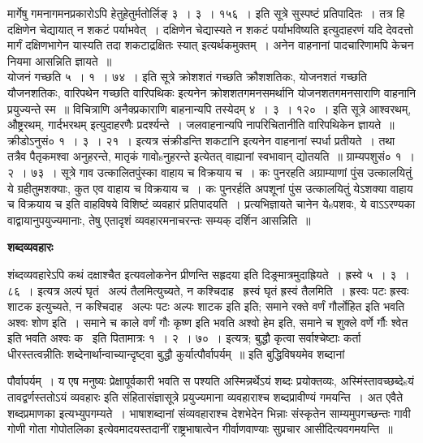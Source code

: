\documentclass[11pt, openany]{book}
\begin{document}
मार्गेषु गमनागमनप्रकारोऽपि हेतुहेतुर्मतोर्लिङ् ३~। ३~। १५६~। इति सूत्रे सुस्पष्टं प्रतिपादितः~। तत्र हि {\qt दक्षिणेन चेद्यायात् न शकटं पर्याभवेत्~।} दक्षिणेन चेद्यास्यते न शकटं पर्याभविष्यति इत्युदाहरणं {\qt यदि देवदत्तो मार्गं दक्षिणभागेन यास्यति तदा शकटाद्रक्षितः स्यात्} इत्यर्थकमुक्तम्~। अनेन वाहनानां पादचारिणामपि केचन नियमा आसन्निति ज्ञायते~॥\\

योजनं गच्छति ५~। १~। ७४~। इति सूत्रे {\qt क्रोशशतं गच्छति क्रौशशतिकः, योजनशतं गच्छति यौजनशतिकः, वारिपथेन गच्छति वारिपथिकः इत्यनेन क्रोशशतगमनसमर्थानि योजनशतगमनसाराणि वाहनानि प्रयुज्यन्ते स्म~॥} विचित्राणि अनैक्प्रकाराणि बाहनान्यपि तस्येदम् ४~। ३~। १२०~। इति सूत्रे {\qt आश्वरथम्, औष्ट्ररथम्, गार्दभरथम्} इत्युदाहरणैः प्रदर्श्यन्ते~। जलवाहनान्यपि नापरिचितानीति वारिपथिकेन ज्ञायते~॥ क्रीडोऽनुसं० १~। ३~। २१~। इत्यत्र {\qt संक्रीडन्ति शकटानि} इत्यनेन वाहनानां स्पर्धा प्रतीयते~। तथा तत्रैव {\qt पैतृकमश्वा अनुहरन्ते, मातृकं गावोsनुहरन्ते} इत्येतत् वाह्यानां स्वभावान् द्योतयति~॥ ग्राम्यपशुसं० १~। २~। ७३~। सूत्रे {\qt गाव उत्कालितपुंस्का वाहाय च विक्रयाय च~। कः पुनरहति अग्राम्याणां पुंस उत्कालयितुं ये ग्रहीतुमशक्याः, कुत एव वाहाय च विक्रयाय च~। कः पुनरर्हति अपशूनां पुंस उत्कालयितुं येऽशक्या वाहाय च विक्रयाय च} इति वाहविषये विशिष्टं व्यवहारं प्रतिपादयति~। प्रत्यभिज्ञायते चानेन येsपशवः, ये वाऽऽरण्यका वाद्वायानुपयुज्यमानाः, तेषु एतादृशं व्यवहारमनाचरन्तः सम्यक् दर्शिन आसन्निति~॥ 

\begin{center}
\textbf{\Large शब्दव्यवहारः \textendash\ }
\end{center}

शंब्दव्यवहारेऽपि कथं दक्षाश्चैत इत्यवलोकनेन प्रीणन्ति सहृदया इति दिङ्र्मात्रमुदाह्रियते~। ह्रस्वे ५~। ३~। ८६~। इत्यत्र {\qt अल्पं घृतं \textendash\ अल्पं तैलमित्युच्यते, न कश्चिदाह \textendash\ ह्रस्वं घृतं ह्रस्वं तैलमिति~। ह्रस्वः पटः ह्रस्वः शाटक इत्युच्यते, न कश्चिदाह \textendash\ अल्पः पटः अल्पः शाटक इति} इति; समाने रक्ते वर्णं गौर्लोहित इति भवति अश्वः शोण इति~। समाने च काले वर्णं गौः कृष्ण इति भवति अश्वो हेम इति, समाने च शुक्ले वर्णे र्गौः श्वेत इति भवति अश्वः क \textendash\ इति पितामात्रः १~। २~। ७०~। इत्यत्र; बुद्धौ कृत्वा सर्वाश्चेष्टाः कर्ता धीरस्तत्वन्नीतिः शब्देनार्थान्वाच्यान्दृष्ट्वा बुद्धौ कुर्यात्पौर्वापर्यम्~॥ इति बुद्धिविषयमेव शब्दानां

\newpage

\noindent
पौर्वापर्यम्~। य एष मनुष्यः प्रेक्षापूर्वकारी भवति स पश्यति अस्मिन्नर्थेऽयं शब्दः प्रयोक्तव्यः, अस्मिंस्तावच्छब्देsयं तावद्वर्णस्ततोऽयं व्यवहारः इति संहितासंज्ञासूत्रे प्रयुज्यमाना व्यवहाराश्च शब्दप्रावीण्यं गमयन्ति~। अत एवैते शब्दप्रमाणका इत्यभ्युपगम्यते~। भाषाशब्दानां संव्यवहाराश्च देशभेदेन भिन्नाः संस्कृतेन साम्यमुपगच्छन्तः {\qt गावी गोणी गोता गोपोतलिका} इत्येवमादयस्तदानीं राष्ट्रभाषात्वेन गीर्वाणवाण्याः सुप्रचार आसीदित्यवगमयन्ति~॥\\
\end{document}
